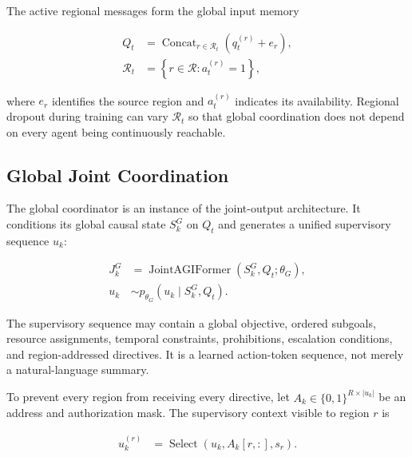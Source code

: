 The active regional messages form the global input memory

\begin{equation}
\begin{aligned}
    Q_t
    &= \mathop{\operatorname{Concat}}_{r\in\mathcal{R}_t}
       \left(q_t^{(r)}+e_r\right),\\
    \mathcal{R}_t
    &= \left\{r\in\mathcal{R}:a_t^{(r)}=1\right\},
\end{aligned}
\label{eq:global_regional_memory}
\end{equation}

where $e_r$ identifies the source region and $a_t^{(r)}$ indicates its availability. Regional dropout during training can vary $\mathcal{R}_t$ so that global coordination does not depend on every agent being continuously reachable.

\subsection{\textbf{Global Joint Coordination}}

The global coordinator is an instance of the joint-output architecture. It conditions its global causal state $S_k^{G}$ on $Q_t$ and generates a unified supervisory sequence $u_k$:

\begin{equation}
\begin{aligned}
    J_k^{G}
    &= \operatorname{JointAGIFormer}\!\left(
       S_k^{G},Q_t;\theta_G
       \right),\\
    u_k
    &\sim p_{\theta_G}\!\left(
       u_k\mid S_k^{G},Q_t
       \right).
\end{aligned}
\label{eq:global_supervision}
\end{equation}

The supervisory sequence may contain a global objective, ordered subgoals, resource assignments, temporal constraints, prohibitions, escalation conditions, and region-addressed directives. It is a learned action-token sequence, not merely a natural-language summary.

To prevent every region from receiving every directive, let $A_k\in\{0,1\}^{R\times |u_k|}$ be an address and authorization mask. The supervisory context visible to region $r$ is

\begin{equation}
\begin{aligned}
    u_k^{(r)}
    &= \operatorname{Select}\!\left(
       u_k,A_k[r,:],s_r
       \right).
\end{aligned}
\label{eq:regional_supervision_mask}
\end{equation}

